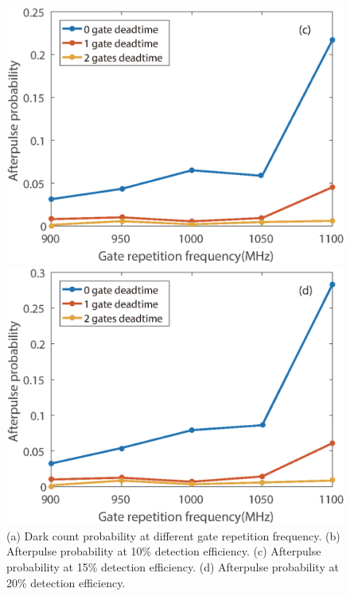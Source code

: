\documentclass[%
 reprint,
superscriptaddress,
 amsmath,amssymb,
 aps,
]{revtex4-1}
\begin{document}
\begin{figure}
\begin{minipage}{0.45\linewidth}
\centering
\includegraphics[width = 1\textwidth]{figure/afterpulse_rate_15percent_efficiency.eps}%
\end{minipage}
\begin{minipage}{0.45\linewidth}
\centering
\includegraphics[width = 1\textwidth]{figure/afterpulse_rate_20percent_efficiency.eps}%
\end{minipage}
\vskip -0.05in
\caption{\label{fig:afterpulse_darkcount_rate}(a) Dark count probability at different gate repetition frequency. (b) Afterpulse probability at 10\% detection efficiency. (c) Afterpulse probability at 15\% detection efficiency. (d)  Afterpulse probability at 20\% detection efficiency.}
\vskip -0.2in
\end{figure}
\end{document}
